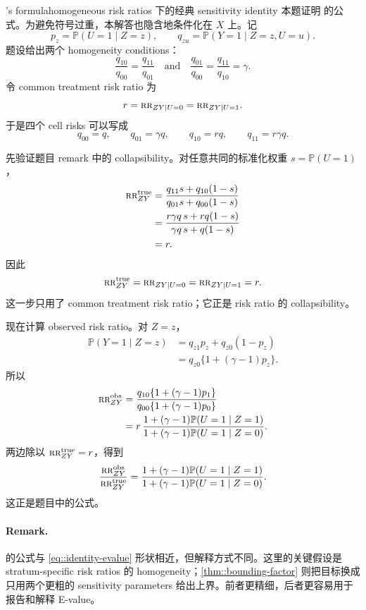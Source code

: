 \begin{exercisesolution}{\citet{Schlesselman::1978}'s formula}{homogeneous risk ratios 下的经典 sensitivity identity}
本题证明 \citet{Schlesselman::1978} 的公式。为避免符号过重，本解答也隐含地条件化在 $X$ 上。记
\[
p_z=\mathbb{P}(U=1\mid Z=z),\qquad
q_{zu}=\mathbb{P}(Y=1\mid Z=z,U=u).
\]
题设给出两个 homogeneity conditions：
\[
\frac{q_{10}}{q_{00}}=\frac{q_{11}}{q_{01}}
\quad\text{and}\quad
\frac{q_{01}}{q_{00}}=\frac{q_{11}}{q_{10}}=\gamma.
\]
令 common treatment risk ratio 为
\[
r=\textsc{rr}_{ZY\mid U=0}=\textsc{rr}_{ZY\mid U=1}.
\]
于是四个 cell risks 可以写成
\[
q_{00}=q,\qquad
q_{01}=\gamma q,\qquad
q_{10}=rq,\qquad
q_{11}=r\gamma q.
\]

先验证题目 remark 中的 collapsibility。对任意共同的标准化权重 $s=\mathbb{P}(U=1)$，
\begin{align*}
\textsc{rr}_{ZY}^{\textup{true}}
&=
\frac{q_{11}s+q_{10}(1-s)}
     {q_{01}s+q_{00}(1-s)}\\
&=
\frac{r\gamma q\,s+rq(1-s)}
     {\gamma q\,s+q(1-s)}\\
&=r.
\end{align*}
因此
\[
\textsc{rr}_{ZY}^{\textup{true}}=\textsc{rr}_{ZY\mid U=0}=\textsc{rr}_{ZY\mid U=1}=r.
\]
这一步只用了 common treatment risk ratio；它正是 risk ratio 的 collapsibility。

现在计算 observed risk ratio。对 $Z=z$，
\begin{align*}
\mathbb{P}(Y=1\mid Z=z)
&=q_{z1}p_z+q_{z0}(1-p_z)\\
&=q_{z0}\{1+(\gamma-1)p_z\}.
\end{align*}
所以
\begin{align*}
\textsc{rr}_{ZY}^{\textup{obs}}
&=
\frac{q_{10}\{1+(\gamma-1)p_1\}}
     {q_{00}\{1+(\gamma-1)p_0\}}\\
&=
r\,
\frac{1+(\gamma-1)\mathbb{P}(U=1\mid Z=1)}
     {1+(\gamma-1)\mathbb{P}(U=1\mid Z=0)}.
\end{align*}
两边除以 $\textsc{rr}_{ZY}^{\textup{true}}=r$，得到
\[
\frac{\textsc{rr}_{ZY}^{\textup{obs}}}{\textsc{rr}_{ZY}^{\textup{true}}}
=
\frac{1+(\gamma-1)\mathbb{P}(U=1\mid Z=1)}
     {1+(\gamma-1)\mathbb{P}(U=1\mid Z=0)}.
\]
这正是题目中的公式。

\paragraph{Remark.}
\citet{Schlesselman::1978} 的公式与 \cref{eq::identity-evalue} 形状相近，但解释方式不同。这里的关键假设是 stratum-specific risk ratios 的 homogeneity；\cref{thm::bounding-factor} 则把目标换成只用两个更粗的 sensitivity parameters 给出上界。前者更精细，后者更容易用于报告和解释 E-value。
\end{exercisesolution}

